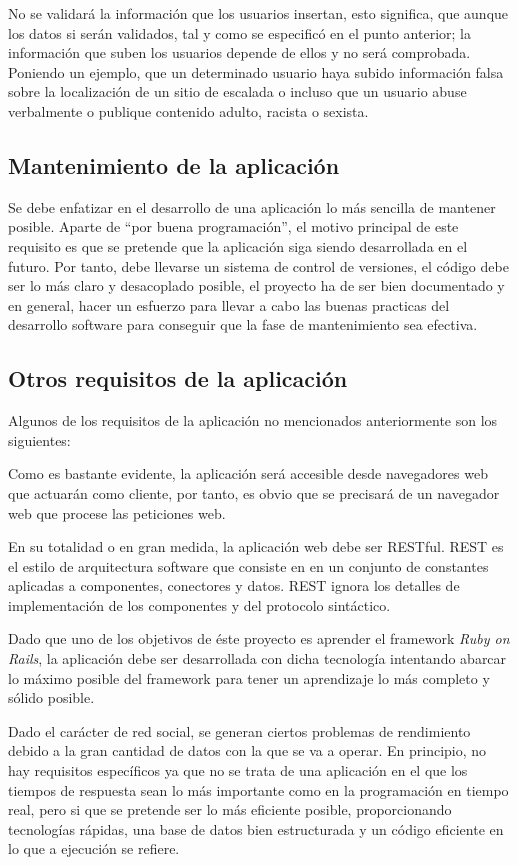 No se validará la información que los usuarios insertan, esto significa, que aunque los datos si serán validados, tal y como se especificó en el punto anterior; la información que suben los usuarios depende de ellos y no será comprobada. Poniendo un ejemplo, que un determinado usuario haya subido información falsa sobre la localización de un sitio de escalada o incluso que un usuario abuse verbalmente o publique contenido adulto, racista o sexista.  



\subsection{Mantenimiento de la aplicación}
Se debe enfatizar en el desarrollo de una aplicación lo más sencilla de mantener posible.
Aparte de ``por buena programación'', el motivo principal de este requisito es que se pretende que la aplicación siga siendo desarrollada en el futuro. Por tanto, debe llevarse un sistema de control de versiones, el código debe ser lo más claro y desacoplado posible, el proyecto ha de ser bien documentado y en general, hacer un esfuerzo para llevar a cabo las buenas practicas del desarrollo software para conseguir que la fase de mantenimiento sea efectiva.


\subsection{Otros requisitos de la aplicación}
Algunos de los requisitos de la aplicación no mencionados anteriormente son los siguientes:

Como es bastante evidente, la aplicación será accesible desde navegadores web que actuarán como cliente, por tanto, es obvio que se precisará de un navegador web que procese las peticiones web.

En su totalidad o en gran medida, la aplicación web debe ser RESTful. REST es el estilo de arquitectura software que consiste en en un conjunto de constantes aplicadas a componentes, conectores y datos. REST ignora los detalles de implementación de los componentes y del protocolo sintáctico. 

Dado que uno de los objetivos de éste proyecto es aprender el framework \textit{Ruby on Rails}, la aplicación debe ser desarrollada con dicha tecnología intentando abarcar lo máximo posible del framework para tener un aprendizaje lo más completo y sólido posible.

Dado el carácter de red social, se generan ciertos problemas de rendimiento debido a la gran cantidad de datos con la que se va a operar.
En principio, no hay requisitos específicos ya que no se trata de una aplicación en el que los tiempos de respuesta sean lo más importante como en la programación en tiempo real, pero si que se pretende ser lo más eficiente posible, proporcionando tecnologías rápidas, una base de datos bien estructurada y un código eficiente en lo que a ejecución se refiere.
